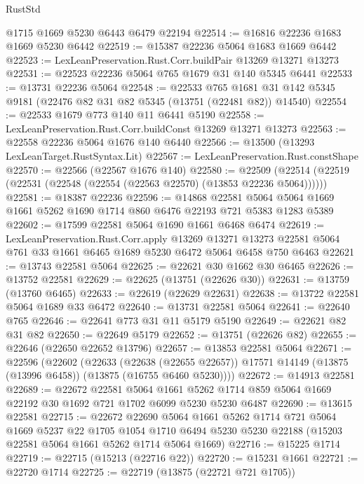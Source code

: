 \begin{lexlean}{RustStd}
\begin{coremodule}
    @1715
    @1669
    @5230
    @6443
    @6479
    @22194
@22514 := @16816 @22236 @1683 @1669 @5230 @6442
@22519 := @15387 @22236 @5064 @1683 @1669 @6442
@22523 := LexLeanPreservation.Rust.Corr.buildPair @13269 @13271 @13273
@22531 := @22523 @22236 @5064 @765 @1679 @31 @140 @5345 @6441
@22533 := @13731 @22236 @5064
@22548 := @22533
    @765
    @1681
    @31
    @142
    @5345
    @9181
    (@22476 @82 @31 @82 @5345 (@13751 (@22481 @82)) @14540)
@22554 := @22533 @1679 @773 @140 @11 @6441 @5190
@22558 := LexLeanPreservation.Rust.Corr.buildConst @13269 @13271 @13273
@22563 := @22558 @22236 @5064 @1676 @140 @6440
@22566 := @13500 (@13293 LexLeanTarget.RustSyntax.Lit)
@22567 := LexLeanPreservation.Rust.constShape
@22570 := @22566 (@22567 @1676 @140)
@22580 := @22509 (@22514 (@22519 (@22531 (@22548 (@22554 (@22563 @22570) (@13853 @22236 @5064))))))
@22581 := @18387 @22236
@22596 := @14868
    @22581
    @5064
    @5064
    @1669
    @1661
    @5262
    @1690
    @1714
    @860
    @6476
    @22193
    @721
    @5383
    @1283
    @5389
@22602 := @17599 @22581 @5064 @1690 @1661 @6468 @6474
@22619 := LexLeanPreservation.Rust.Corr.apply
    @13269
    @13271
    @13273
    @22581
    @5064
    @761
    @33
    @1661
    @6465
    @1689
    @5230
    @6472
    @5064
    @6458
    @750
    @6463
@22621 := @13743 @22581 @5064
@22625 := @22621 @30 @1662 @30 @6465
@22626 := @13752 @22581
@22629 := @22625 (@13751 (@22626 @30))
@22631 := @13759 (@13760 @6465)
@22633 := @22619 (@22629 @22631)
@22638 := @13722 @22581 @5064 @1689 @33 @6472
@22640 := @13731 @22581 @5064
@22641 := @22640 @765
@22646 := @22641 @773 @31 @11 @5179 @5190
@22649 := @22621 @82 @31 @82
@22650 := @22649 @5179
@22652 := @13751 (@22626 @82)
@22655 := @22646 (@22650 @22652 @13796)
@22657 := @13853 @22581 @5064
@22671 := @22596
    (@22602
      (@22633
        (@22638 (@22655 @22657))
        @17571
        @14149
        (@13875 (@13996 @6458))
        (@13875 (@16755 @6460 @5230))))
@22672 := @14913 @22581
@22689 := @22672
    @22581
    @5064
    @1661
    @5262
    @1714
    @859
    @5064
    @1669
    @22192
    @30
    @1692
    @721
    @1702
    @6099
    @5230
    @5230
    @6487
@22690 := @13615 @22581
@22715 := @22672
    @22690
    @5064
    @1661
    @5262
    @1714
    @721
    @5064
    @1669
    @5237
    @22
    @1705
    @1054
    @1710
    @6494
    @5230
    @5230
    @22188
    (@15203 @22581 @5064 @1661 @5262 @1714 @5064 @1669)
@22716 := @15225 @1714
@22719 := @22715 (@15213 (@22716 @22))
@22720 := @15231 @1661
@22721 := @22720 @1714
@22725 := @22719 (@13875 (@22721 @721 @1705))

\end{coremodule}
\end{lexlean}
